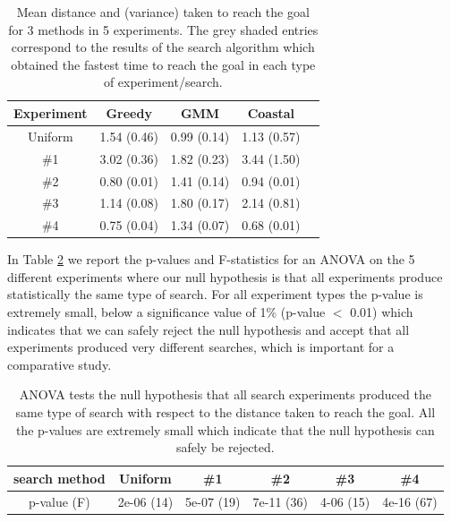 \begin{table}
 \centering
  \begin{tabular}{|c|c|c|c|c|}     
  \hline
      Experiment       &  \textbf{Greedy}      	  	&  \textbf{GMM}      		&  \textbf{Coastal}     \\\hline
       Uniform         &   1.54 (0.46) 	  		& 0.99 (0.14) \cellcolor{Gray} 	& 1.13 (0.57)    \\
	\#1            &   3.02 (0.36)    		& 1.82 (0.23) \cellcolor{Gray} 	& 3.44 (1.50)    \\
	\#2            &   0.80 (0.01) \cellcolor{Gray} & 1.41 (0.14) 			& 0.94 (0.01)    \\
	\#3            &   1.14 (0.08) \cellcolor{Gray} & 1.80 (0.17) 			& 2.14 (0.81)    \\
	\#4            &   0.75 (0.04)  		& 1.34 (0.07) 			& 0.68 (0.01) \cellcolor{Gray} \\ \hline
 \end{tabular}
  \caption{Mean distance and (variance) taken to reach the goal for 3 methods in 5 experiments. The grey shaded entries correspond to the results of the search algorithm 
  which obtained the fastest time to reach the goal in each type of experiment/search.}
  \label{tab:mean-var-distance}
\end{table}

In Table \ref{tab:anova-1} we report the p-values and F-statistics for an ANOVA on the 5 different experiments where our 
null hypothesis is that all experiments produce statistically the same type of search. For all experiment types the p-value 
is extremely small, below a significance value of 1\% (p-value $<$ 0.01) which indicates that we can safely reject the 
null hypothesis and accept that all experiments produced very different searches, which is important for a 
comparative study.

\begin{table}
 \centering
  \begin{tabular}{|c|c|c|c|c|c|}
  \hline
   search method &  Uniform       &   \#1	   & 	\#2	     & 	    \#3	       &   \#4 \\ \hline
   p-value (F)   &  2e-06 (14) & 5e-07 (19) &  7e-11 (36) &  4-06 (15) &  4e-16 (67) \\ \hline
 \end{tabular}
 \caption{ANOVA tests the null hypothesis that all search experiments produced the same type of search with respect to the distance taken to reach the goal. 
 All the p-values are extremely small which indicate that the null hypothesis can safely be rejected.}
 \label{tab:anova-1}
\end{table}

